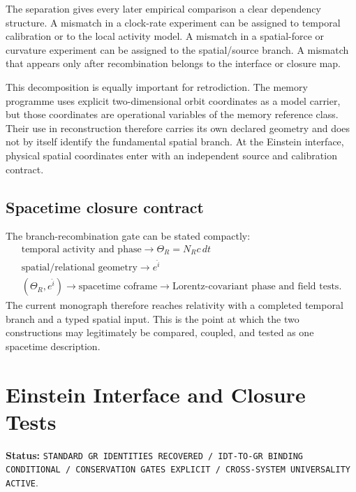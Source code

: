 The separation gives every later empirical comparison a clear dependency structure. A mismatch in a clock-rate experiment can be assigned to temporal calibration or to the local activity model. A mismatch in a spatial-force or curvature experiment can be assigned to the spatial/source branch. A mismatch that appears only after recombination belongs to the interface or closure map.

This decomposition is equally important for retrodiction. The memory programme uses explicit two-dimensional orbit coordinates as a model carrier, but those coordinates are operational variables of the memory reference class. Their use in reconstruction therefore carries its own declared geometry and does not by itself identify the fundamental spatial branch. At the Einstein interface, physical spatial coordinates enter with an independent source and calibration contract.

\section{Spacetime closure contract}

The branch-recombination gate can be stated compactly:
\[
\boxed{
\begin{array}{c}
\text{temporal activity and phase}
\longrightarrow
\Theta_R=N_Rc\,dt\\[2mm]
\text{spatial/relational geometry}
\longrightarrow
e^{\hat i}\\[2mm]
(\Theta_R,e^{\hat i})
\longrightarrow
\text{spacetime coframe}
\longrightarrow
\text{Lorentz-covariant phase and field tests}.
\end{array}}
\]
The current monograph therefore reaches relativity with a completed temporal branch and a typed spatial input. This is the point at which the two constructions may legitimately be compared, coupled, and tested as one spacetime description.


\chapter{Einstein Interface and Closure Tests}

\noindent\textbf{Status:} \texttt{STANDARD GR IDENTITIES RECOVERED / IDT-TO-GR BINDING CONDITIONAL / CONSERVATION GATES EXPLICIT / CROSS-SYSTEM UNIVERSALITY ACTIVE}.

